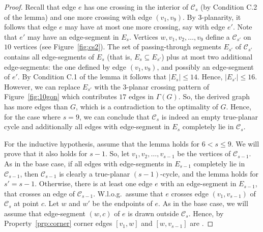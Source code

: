 \begin{proof}
Recall that edge $e$ has one crossing in the interior of $\mathcal{C}_s$ (by Condition C.2 of the lemma) and one more crossing with edge $(v_1,v_9)$. By $3$-planarity, it follows that edge $e$ may have at most one more crossing, say with edge $e'$. Note that $e'$ may have an edge-segment in $E_s$. Vertices $w,v_1,v_2,\dots,v_9$ define a \pp $\mathcal{C}_{s'}$ on $10$ vertices (see Figure~\ref{fig:cs2}). The set of passing-through segments $E_{s'}$ of $\mathcal{C}_{s'}$ contains all edge-segments of $E_s$ (that is, $E_s \subseteq E_{s'}$) plus at most two additional edge-segments: the one defined by edge $(v_1,v_9)$, and possibly an edge-segment of $e'$. By Condition C.1 of the lemma it follows that $|E_s| \leq 14$. Hence, $|E_{s'}| \leq 16$. However, we can replace $E_{s'}$ with the $3$-planar crossing pattern of Figure~\ref{fig:10gon} which contributes $17$ edges in $\Gamma(G)$. So, the derived graph has more edges than $G$, which is a contradiction to the optimality of $G$. Hence, for the case where $s=9$, we can conclude that $\mathcal{C}_s$ is indeed an empty true-planar cycle and additionally all edges with edge-segment in $E_s$ completely lie in $\mathcal{C}_s$.

For the inductive hypothesis, assume that the lemma holds for $6<s\leq 9$. We will prove that it also holds for $s-1$. So, let $v_1,v_2,\dots,v_{s-1}$ be the vertices of $\mathcal{C}_{s-1}$. As in the base case, if all edges with edge-segments in $E_{s-1}$ completely lie in $\mathcal{C}_{s-1}$, then $\mathcal{C}_{s-1}$ is clearly a true-planar $(s-1)$-cycle, and the lemma holds for $s'=s-1$. Otherwise, there is at least one edge $e$ with an edge-segment in $E_{s-1}$, that crosses an edge of $\mathcal{C}_{s-1}$. W.l.o.g.~assume that $e$ crosses edge $(v_1,v_{s-1})$ of $\mathcal{C}_s$ at point $c$. Let $w$ and $w'$ be the endpoints of $e$. As in the base case, we will assume that edge-segment $(w,c)$ of $e$ is drawn outside $\mathcal{C}_s$. Hence, by Property~\ref{prp:corner} corner edges $[v_1,w]$ and $[w,v_{s-1}]$ are \pes.


\end{proof}
